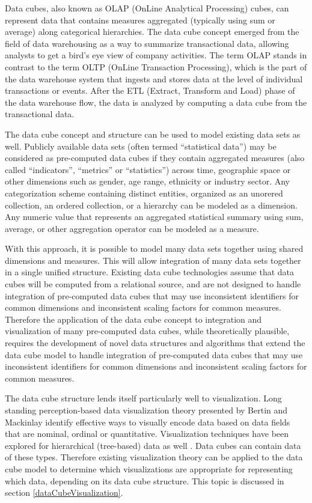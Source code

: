 
Data cubes, also known as OLAP (OnLine Analytical Processing) cubes, can represent data that contains measures aggregated (typically using sum or average) along categorical hierarchies. The data cube concept emerged from the field of data warehousing as a way to summarize transactional data, allowing analysts to get a bird's eye view of company activities. The term OLAP stands in contrast to the term OLTP (OnLine Transaction Processing), which is the part of the data warehouse system that ingests and stores data at the level of individual transactions or events. After the ETL (Extract, Transform and Load) phase of the data warehouse flow, the data is analyzed by computing a data cube from the transactional data.

The data cube concept and structure can be used to model existing data sets as well. Publicly available data sets (often termed ``statistical data'') may be considered as pre-computed data cubes if they contain aggregated measures (also called ``indicators'', ``metrics'' or ``statistics'') across time, geographic space or other dimensions such as gender, age range, ethnicity or industry sector. Any categorization scheme containing distinct entities, organized as an unorered collection, an ordered collection, or a hierarchy can be modeled as a dimension. Any numeric value that represents an aggregated statistical summary using sum, average, or other aggregation operator can be modeled as a measure.

With this approach, it is possible to model many data sets together using shared dimensions and measures. This will allow integration of many data sets together in a single unified structure. Existing data cube technologies assume that data cubes will be computed from a relational source, and are not designed to handle integration of pre-computed data cubes that may use inconsistent identifiers for common dimensions and inconsistent scaling factors for common measures. Therefore the application of the data cube concept to integration and visualization of many pre-computed data cubes, while theoretically plausible, requires the development of novel data structures and algorithms that extend the data cube model to handle integration of pre-computed data cubes that may use inconsistent identifiers for common dimensions and inconsistent scaling factors for common measures.

The data cube structure lends itself particularly well to visualization. Long standing perception-based data visualization theory presented by Bertin \cite{bertin1983semiology} and Mackinlay \cite{mackinlay1986automating} identify effective ways to visually encode data based on data fields that are nominal, ordinal or quantitative. Visualization techniques have been explored for hierarchical (tree-based) data as well \cite{graham2010survey}. Data cubes can contain data of these types. Therefore existing visualization theory can be applied to the data cube model to determine which visualizations are appropriate for representing which data, depending on its data cube structure. This topic is discussed in section \ref{dataCubeVisualization}.

